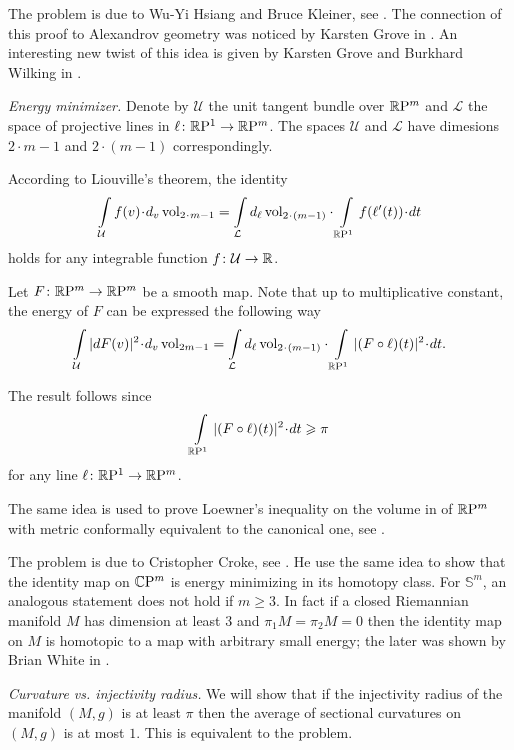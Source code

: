The problem is due to 
Wu-Yi Hsiang 
and Bruce Kleiner, see \cite{hsiang-kleiner}.
The connection of this proof to Alexandrov geometry was noticed by Karsten Grove in \cite{grove}.
An interesting new twist of this idea 
is given by 
Karsten Grove 
and Burkhard Wilking 
in  \cite{grove-wilking}.

\textit{Energy minimizer.}
Denote by $\mathcal{U}$ the unit tangent bundle over $\mathbb{R}\mathrm{P}^m$
and $\mathcal{L}$ the space of projective lines in $\ell\colon\mathbb{R}\mathrm{P}^1\to \mathbb{R}\mathrm{P}^m$.
The spaces $\mathcal{U}$ and $\mathcal{L}$ 
have dimesions $2\cdot m-1$ 
and $2\cdot(m-1)$
correspondingly.


According to Liouville's theorem, the identity
\[\int\limits_{\mathcal{U}}f(v)\cdot d_v\vol_{2\cdot m-1}
=
\int\limits_{\mathcal{L}}d_\ell\vol_{2\cdot(m-1)}\cdot\int\limits_{\RP^1} f(\ell'(t))\cdot dt\]
holds for any integrable function $f\colon\mathcal{U}\to\mathbb{R}$.

Let $F\colon\mathbb{R}\mathrm{P}^m\to\mathbb{R}\mathrm{P}^m$ be a smooth map.
Note that up to multiplicative constant,
the energy of $F$ can be expressed the following way
\[\int\limits_{\mathcal{U}} |dF(v)|^2\cdot d_v\vol_{2m-1}
=
\int\limits_{\mathcal{L}}d_\ell\vol_{2\cdot(m-1)}\cdot\int\limits_{\RP^1} |(F\circ \ell)(t)|^2\cdot dt.\]

The result follows since
\[\int\limits_{\RP^1} |(F\circ \ell)(t)|^2\cdot dt\ge \pi\]
for any line $\ell\colon\mathbb{R}\mathrm{P}^1\to \mathbb{R}\mathrm{P}^m$.

The same idea is used to prove Loewner's inequality on the volume in of $\mathbb{R}\mathrm{P}^m$ with metric conformally equivalent to the canonical one, see \cite{gromov-filling}.

The problem is due to Cristopher Croke, see \cite{croke-energy}. 
He use the same idea to show that the identity map on $\mathbb{C}\mathrm{P}^m$ is energy minimizing in its homotopy class.
For $\mathbb S^m$, an analogous statement does not hold if $m\ge 3$.
In fact if a closed Riemannian manifold $M$ 
has dimension at least 3 
and $\pi_1M=\pi_2M=0$ 
then the identity map on $M$ is homotopic 
to a map with arbitrary small energy;
the later was shown by Brian White in \cite{white}.



\textit{Curvature vs. injectivity radius.}
We will show that if the injectivity radius of the manifold $(M,g)$ is at least $\pi$
then the average of sectional curvatures on $(M,g)$ is at most $1$.
This is equivalent to the problem.

